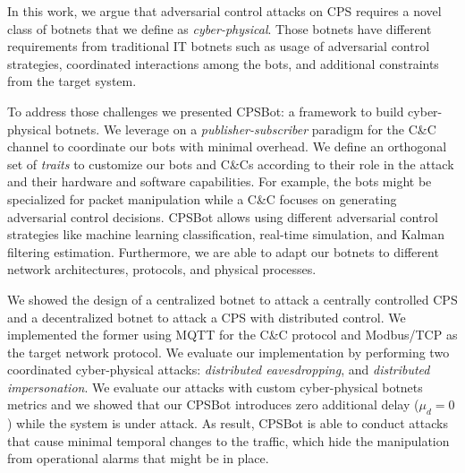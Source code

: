 \documentclass[sigconf]{acmart}
\makeatletter
\newcommand{\Botnet}{CPSBot\@\xspace}
\newcommand{\CC}{C\&C\@\xspace}
\newcommand{\CCs}{C\&Cs\@\xspace}
\makeatother
\begin{document}
In this work, we argue that adversarial control attacks on CPS requires a
novel class of botnets that we define as \emph{cyber-physical}. Those botnets
have different requirements from traditional IT botnets such as usage of
adversarial control strategies, coordinated interactions among the bots, and
additional constraints from the target system. 



To address those challenges we presented \Botnet: a framework to build
cyber-physical botnets. We leverage on a \emph{publisher-subscriber} paradigm
for the \CC channel to coordinate our bots with minimal overhead. We define
an orthogonal set of \emph{traits} to customize our bots and \CCs according
to their role in the attack and their hardware and software capabilities. For
example, the bots might be specialized for packet manipulation while a \CC
focuses on generating adversarial control decisions. \Botnet allows using
different adversarial control strategies like machine learning classification,
real-time simulation, and Kalman filtering estimation. Furthermore, we are
able to adapt our botnets to different network architectures, protocols, and
physical processes.

We showed the design of a centralized botnet to attack a centrally controlled
CPS and a decentralized botnet to attack a CPS with distributed control. We
implemented the former using MQTT for the \CC protocol and Modbus/TCP as
the target network protocol. We evaluate our implementation by performing
two coordinated cyber-physical attacks: \emph{distributed eavesdropping},
and \emph{distributed impersonation}. We evaluate our attacks with custom
cyber-physical botnets metrics and we showed that our \Botnet introduces zero
additional delay ($\mu_d = 0$) while the system is under attack. As result,
\Botnet is able to conduct attacks that cause minimal temporal changes to the
traffic, which hide the manipulation from operational alarms that might be in
place.

\end{document}
